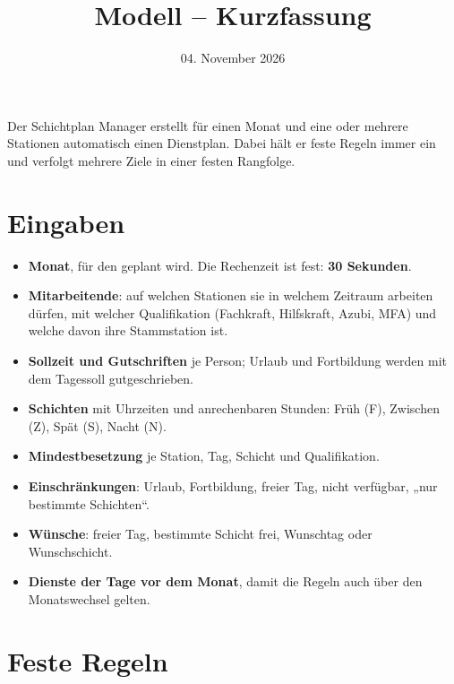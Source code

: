 \documentclass[11pt]{combiArticle}
\begin{document}
\title{Modell -- Kurzfassung}
\date{04. November 2026}
\maketitle

Der Schichtplan Manager erstellt für einen Monat und eine oder mehrere Stationen automatisch einen
Dienstplan. Dabei hält er feste Regeln immer ein und verfolgt mehrere Ziele in einer festen Rangfolge.

\section{Eingaben}

\begin{itemize}
  \item \textbf{Monat}, für den geplant wird. Die Rechenzeit ist fest: \textbf{30 Sekunden}.
  \item \textbf{Mitarbeitende}: auf welchen Stationen sie in welchem Zeitraum arbeiten dürfen, mit welcher
        Qualifikation (Fachkraft, Hilfskraft, Azubi, MFA) und welche davon ihre Stammstation ist.
  \item \textbf{Sollzeit und Gutschriften} je Person; Urlaub und Fortbildung werden mit dem Tagessoll gutgeschrieben.
  \item \textbf{Schichten} mit Uhrzeiten und anrechenbaren Stunden: Früh (F), Zwischen (Z), Spät (S), Nacht (N).
  \item \textbf{Mindestbesetzung} je Station, Tag, Schicht und Qualifikation.
  \item \textbf{Einschränkungen}: Urlaub, Fortbildung, freier Tag, nicht verfügbar, „nur bestimmte Schichten“.
  \item \textbf{Wünsche}: freier Tag, bestimmte Schicht frei, Wunschtag oder Wunschschicht.
  \item \textbf{Dienste der Tage vor dem Monat}, damit die Regeln auch über den Monatswechsel gelten.
\end{itemize}

\section{Feste Regeln}
\end{document}
